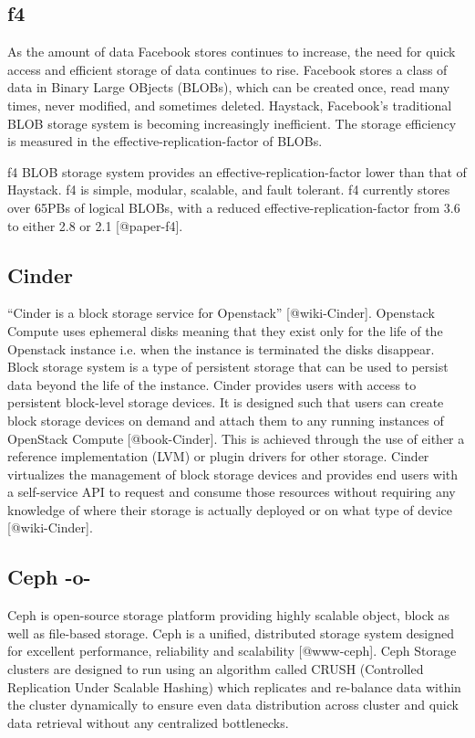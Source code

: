 \subsection{f4}
     
As the amount of data Facebook stores continues to increase, the need
for quick access and efficient storage of data continues to rise.
Facebook stores a class of data in Binary Large OBjects (BLOBs), which
can be created once, read many times, never modified, and sometimes
deleted. Haystack, Facebook's traditional BLOB storage system is
becoming increasingly inefficient. The storage efficiency is measured
in the effective-replication-factor of BLOBs.

f4 BLOB storage system provides an effective-replication-factor lower
than that of Haystack. f4 is simple, modular, scalable, and fault
tolerant. f4 currently stores over 65PBs of logical BLOBs, with a
reduced effective-replication-factor from 3.6 to either 2.8 or 2.1
[@paper-f4].

     
\subsection{Cinder}
      
``Cinder is a block storage service for
Openstack'' [@wiki-Cinder]. Openstack Compute uses ephemeral disks
meaning that they exist only for the life of the Openstack instance
i.e. when the instance is terminated the disks disappear. Block
storage system is a type of persistent storage that can be used to
persist data beyond the life of the instance. Cinder provides users
with access to persistent block-level storage devices. It is designed
such that users can create block storage devices on demand and attach
them to any running instances of OpenStack
Compute [@book-Cinder]. This is achieved through the use of either
a reference implementation (LVM) or plugin drivers for other
storage. Cinder virtualizes the management of block storage devices
and provides end users with a self-service API to request and consume
those resources without requiring any knowledge of where their storage
is actually deployed or on what type of device [@wiki-Cinder].
     
\subsection{Ceph -o-}

Ceph is open-source storage platform providing highly scalable object,
block as well as file-based storage. Ceph is a unified, distributed
storage system designed for excellent performance, reliability and
scalability [@www-ceph]. Ceph Storage clusters are designed to run
using an algorithm called CRUSH (Controlled Replication Under Scalable
Hashing) which replicates and re-balance data within the cluster
dynamically to ensure even data distribution across cluster and quick
data retrieval without any centralized bottlenecks.
 
